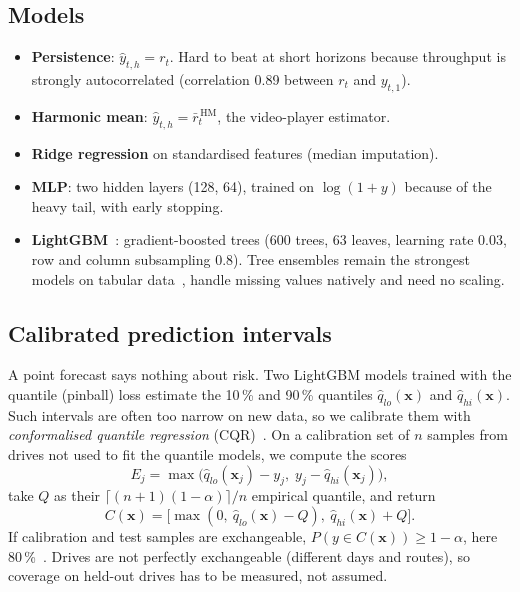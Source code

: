 \documentclass[10pt,a4paper,twocolumn]{article}
\newcommand{\x}{\bm{x}}
\begin{document}
\subsection{Models}
\begin{itemize}
\item \textbf{Persistence}: $\hat y_{t,h}=r_t$. Hard to beat at short horizons because
throughput is strongly autocorrelated (correlation 0.89 between $r_t$ and $y_{t,1}$).
\item \textbf{Harmonic mean}: $\hat y_{t,h}=\bar r^{\,\text{HM}}_t$, the video-player
estimator.
\item \textbf{Ridge regression} on standardised features (median imputation).
\item \textbf{MLP}: two hidden layers (128, 64), trained on $\log(1+y)$ because of the
heavy tail, with early stopping.
\item \textbf{LightGBM}~\cite{lightgbm}: gradient-boosted trees (600 trees, 63 leaves,
learning rate 0.03, row and column subsampling 0.8). Tree ensembles remain the strongest
models on tabular data~\cite{grinsztajn}, handle missing values natively and need no
scaling.
\end{itemize}

\subsection{Calibrated prediction intervals}
A point forecast says nothing about risk. Two LightGBM models trained with the quantile
(pinball) loss estimate the 10\,\% and 90\,\% quantiles $\hat q_{lo}(\x)$ and
$\hat q_{hi}(\x)$. Such intervals are often too narrow on new data, so we calibrate them with
\emph{conformalised quantile regression} (CQR)~\cite{cqr}. On a calibration set of $n$
samples from drives not used to fit the quantile models, we compute the scores
\begin{equation}
E_j=\max\big(\hat q_{lo}(\x_j)-y_j,\; y_j-\hat q_{hi}(\x_j)\big),
\end{equation}
take $Q$ as their $\lceil (n+1)(1-\alpha)\rceil/n$ empirical quantile, and return
\begin{equation}
C(\x)=\big[\max(0,\ \hat q_{lo}(\x)-Q),\ \hat q_{hi}(\x)+Q\big].
\label{eq:cqr}
\end{equation}
If calibration and test samples are exchangeable, $P(y\in C(\x))\ge 1-\alpha$, here
80\,\%~\cite{vovk,angelopoulos}. Drives are not perfectly exchangeable (different days and
routes), so coverage on held-out drives has to be measured, not assumed.
\end{document}
